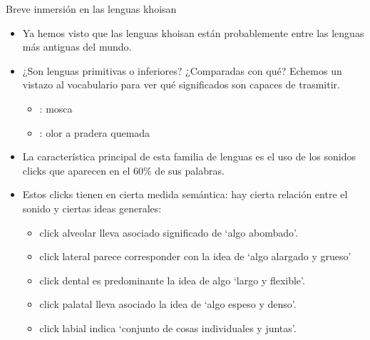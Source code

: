 \documentclass[handout]{beamer}
\begin{document}
\begin{frame}{Breve inmersión en las lenguas khoisan}
\begin{itemize}
	\item Ya hemos visto que las lenguas khoisan están probablemente entre las lenguas más antiguas del mundo. 
	\item ¿Son lenguas primitivas o inferiores? ¿Comparadas con qué? Echemos un vistazo al vocabulario para ver qué significados son capaces de trasmitir.
	\begin{itemize}
		\item \ipa{[g\!ohx'ó\~o]}: mosca
		\item \ipa{[dts'kx'\=ala]}: olor a pradera quemada
	\end{itemize}
	\item La característica principal de esta familia de lenguas es el uso de los sonidos clicks que aparecen en el 60\% de sus palabras.
	\item Estos clicks tienen en cierta medida semántica: hay cierta relación entre el sonido y ciertas ideas generales:  
	\begin{itemize}
		\item click alveolar lleva asociado significado de `algo abombado'.
		\item click lateral parece corresponder con la idea de `algo alargado y grueso'
		\item click dental es predominante la idea de algo `largo y flexible'.
		\item click palatal lleva asociado la idea de `algo espeso y denso'.
		\item click labial indica `conjunto de cosas individuales y juntas'.
	\end{itemize}
\end{itemize}
\end{frame}
\end{document}
